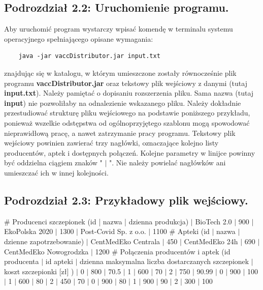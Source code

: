 \documentclass[a4paper]{article}
\newcommand\tab[1][1cm]{\hspace*{#1}}
\begin{document}
\subsection*{Podrozdział 2.2: Uruchomienie programu.}
\tab Aby uruchomić program wystarczy wpisać komendę w terminalu systemu operacyjnego spełniającego opisane wymagania:
\begin{lstlisting}
	java -jar vaccDistributor.jar input.txt
\end{lstlisting}
znajdując się w katalogu, w którym umieszczone zostały równocześnie plik programu \textbf{vaccDistributor.jar} oraz tekstowy plik wejściowy z danymi (tutaj \textbf{input.txt}). Należy pamiętać o dopisaniu rozszerzenia pliku. Sama nazwa (tutaj \textbf{input}) nie pozwoliłaby na odnalezienie wskazanego pliku. \newline \newline
\tab Należy dokładnie przestudiować strukturę pliku wejściowego na podstawie poniższego przykładu, ponieważ wszelkie odstępstwa od ogólnoprzyjętego szablonu mogą spowodować nieprawidłową pracę, a nawet zatrzymanie pracy programu. Tekstowy plik wejściowy powinien zawierać trzy nagłówki, oznaczające kolejno listy producentów, aptek i dostępnych połączeń. Kolejne parametry w linijce powinny być oddzielna ciągiem znaków " $|$ ". Nie należy powielać nagłówków ani umieszczać ich w innej kolejności.
 
\newpage
\subsection*{Podrozdział 2.3: Przykładowy plik wejściowy.}
\begin{tcolorbox}
\# Producenci szczepionek (id | nazwa | dzienna produkcja)
 $|$ BioTech 2.0 $|$ 900
 $|$ EkoPolska 2020 $|$ 1300
 $|$ Post-Covid Sp. z o.o. $|$ 1100
\newline \# Apteki (id $|$ nazwa $|$ dzienne zapotrzebowanie)
 $|$ CentMedEko Centrala $|$ 450 
 $|$ CentMedEko 24h $|$ 690 
 $|$ CentMedEko Nowogrodzka $|$ 1200
\newline \# Połączenia producentów i aptek (id producenta $|$ id apteki $|$ dzienna maksymalna liczba dostarczanych szczepionek $|$ koszt szczepionki [zł] )
 $|$ 0 $|$ 800 $|$ 70.5 
 $|$ 1 $|$ 600 $|$ 70 
 $|$ 2 $|$ 750 $|$ 90.99
 $|$ 0 $|$ 900 $|$ 100 
 $|$ 1 $|$ 600 $|$ 80
 $|$ 2 $|$ 450 $|$ 70
 $|$ 0 $|$ 900 $|$ 80
 $|$ 1 $|$ 900 $|$ 90
 $|$ 2 $|$ 300 $|$ 100
\end{tcolorbox}
\end{document}
